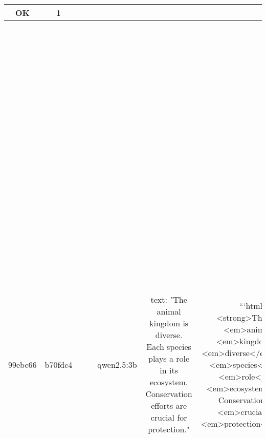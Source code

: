 \begin{table}[h!]
\begin{tabular}{|c|c|c|c|c|c|c|c|c|c|}
OK & 1\\
\hline
99ebe66 & b70fdc4 &  &  & qwen2.5:3b & text: "The animal kingdom is diverse. Each species plays a role in its ecosystem. Conservation efforts are crucial for protection." & ```html
<p><strong>The</strong> <em>animal</em> <em>kingdom</em> is <em>diverse</em>.<br>
Each <em>species</em> plays a <em>role</em> in its <em>ecosystem</em>.<br>
Conservation efforts are <em>crucial</em> for <em>protection</em>.</p>
``` & err & The output provided does not comply with the description for several reasons. First, the requirement is to split the paragraph into individual sentences and wrap each sentence with a <p> tag. Here, all sentences are within a single <p> tag, separated by <br> tags instead. This means there should be separate <p> tags for each sentence, but there is only one <p> tag. Additionally, the description states that there should be at least three <p> tags in total. This output contains only one <p> tag, which is a clear violation of the requirement.

ERR & 1\\
\hline
99ebe66 & b70fdc4 &  &  & gemma2:9b & text: "The animal kingdom is diverse. Each species plays a role in its ecosystem. Conservation efforts are crucial for protection." & Here's the HTML formatting for your paragraph, incorporating your requests:

<p><strong>The</strong> <em>animal kingdom</em> is <strong>diverse</strong>.</p>
<p><strong>Each</strong> <em>species</em> plays a <em>role</em> in its <em>ecosystem</em>.</p>
<p><strong>Conservation</strong> <em>efforts</em> are <strong>crucial</strong> for <em>protection</em>.</p>


Let me know if you would like to make any further changes or have any other text you'd like formatted! & ok & Upon evaluating the output against the provided description, the following observations can be made:

1. The output contains multiple `<p>` tags. Specifically, there are three `<p>` tags, which satisfies the requirement that the output should have at least three `<p>` tags.

2. Within each `<p>` tag, there is the inclusion of a `<strong>` tag as described. Each sentence has at least one word wrapped in a `<strong>` tag which shows compliance with the requirement of having one `<strong>` tag inside each `<p>` tag.

3. Multiple `<em>` tags are used within each `<p>` tag to emphasize key words and phrases, as required by the description.


\end{tabular}
\end{table}
